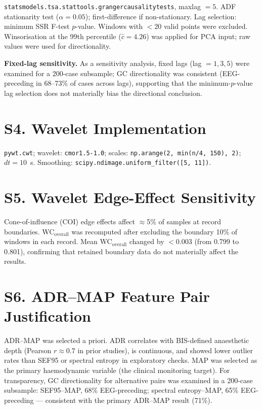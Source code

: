 \documentclass[fleqn,10pt]{wlpeerj}
\begin{document}
\texttt{statsmodels.tsa.stattools.grangercausalitytests}, maxlag $= 5$. ADF stationarity test
($\alpha = 0.05$); first-difference if non-stationary. Lag selection: minimum SSR F-test
$p$-value. Windows with $<$20 valid points were excluded. Winsorisation at the 99th percentile
($\hat{c} = 4.26$) was applied for PCA input; raw values were used for directionality.

\textbf{Fixed-lag sensitivity.} As a sensitivity analysis, fixed lags (lag $= 1, 3, 5$) were
examined for a 200-case subsample; GC directionality was consistent (EEG-preceding in 68--73\%
of cases across lags), supporting that the minimum-$p$-value lag selection does not materially
bias the directional conclusion.

\section{S4. Wavelet Implementation}

\texttt{pywt.cwt}; wavelet: \texttt{cmor1.5-1.0}; scales:
\texttt{np.arange(2, min(n/4, 150), 2)}; $dt = 10$~s. Smoothing:
\texttt{scipy.ndimage.uniform\_filter([5, 11])}.

\section{S5. Wavelet Edge-Effect Sensitivity}

Cone-of-influence (COI) edge effects affect $\approx$5\% of samples at record boundaries.
WC$_\text{overall}$ was recomputed after excluding the boundary 10\% of windows in each
record. Mean WC$_\text{overall}$ changed by $<$0.003 (from 0.799 to 0.801), confirming that
retained boundary data do not materially affect the results.

\section{S6. ADR--MAP Feature Pair Justification}

ADR--MAP was selected a priori. ADR correlates with BIS-defined anaesthetic depth (Pearson
$r \approx 0.7$ in prior studies), is continuous, and showed lower outlier rates than SEF95 or
spectral entropy in exploratory checks. MAP was selected as the primary haemodynamic variable
(the clinical monitoring target). For transparency, GC directionality for alternative pairs was
examined in a 200-case subsample: SEF95--MAP, 68\% EEG-preceding; spectral entropy--MAP, 65\%
EEG-preceding --- consistent with the primary ADR--MAP result (71\%).
\end{document}
